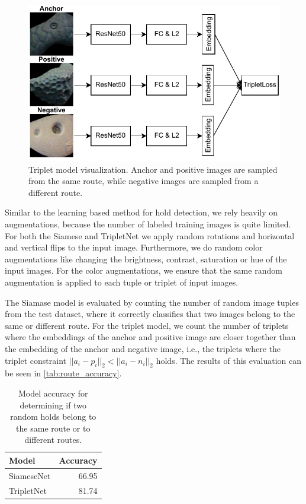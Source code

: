 \documentclass[final]{cvpr}
\begin{document}
\begin{figure}
    \centering
    \includegraphics[width = 0.9\linewidth]{img/triplet_model.pdf}
    \caption{Triplet model visualization. Anchor and positive images are sampled from the same route, while negative images are sampled from a different route.}
    \label{fig:triplet_model}
\end{figure}

Similar to the learning based method for hold detection, we rely heavily on augmentations, because the number of labeled training images is quite limited. For both the Siamese and TripletNet we apply random rotations and horizontal and vertical flips to the input image. Furthermore, we do random color augmentations like changing the brightness, contrast, saturation or hue of the input images. For the color augmentations, we ensure that the same random augmentation is applied to each tuple or triplet of input images.

The Siamase model is evaluated by counting the number of random image tuples from the test dataset, where it correctly classifies that two images belong to the same or different route.
For the triplet model, we count the number of triplets where the embeddings of the anchor and positive image are closer together than the embedding of the anchor and negative image, i.e., the triplets where the triplet constraint $||a_i - p_i||_2 < ||a_i - n_i||_2$ holds.
The results of this evaluation can be seen in \autoref{tab:route_accuracy}.

\begin{table}[]
    \centering
    \begin{tabular}{lr}
    \toprule
         Model & Accuracy\\
         \midrule
         SiameseNet &  66.95\\
         TripletNet & 81.74\\ \bottomrule
    \end{tabular}
    \caption{Model accuracy for determining if two random holds belong to the same route or to different routes.}
    \label{tab:route_accuracy}
\end{table}
\end{document}
